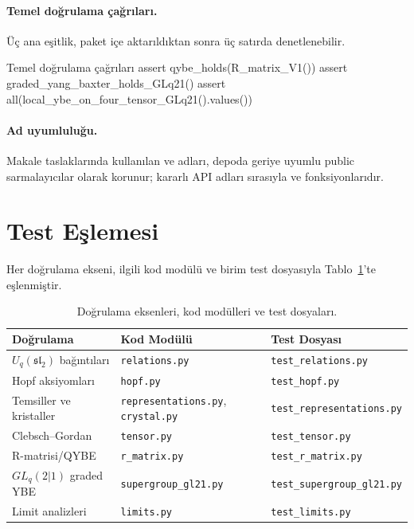 \documentclass[10pt]{math}
\numberwithin{equation}{section}
\theoremstyle{plain}
\theoremstyle{definition}
\renewcommand{\sl}{\mathfrak{sl}}
\begin{document}
\paragraph{Temel doğrulama çağrıları.} Üç ana eşitlik, paket içe aktarıldıktan
sonra üç satırda denetlenebilir.
\begin{pythoncode}{Temel doğrulama çağrıları}
assert qybe_holds(R_matrix_V1())
assert graded_yang_baxter_holds_GLq21()
assert all(local_ybe_on_four_tensor_GLq21().values())
\end{pythoncode}

\paragraph{Ad uyumluluğu.} Makale taslaklarında kullanılan
 ve 
adları, depoda geriye uyumlu public sarmalayıcılar olarak korunur; kararlı API
adları sırasıyla  ve
 fonksiyonlarıdır.

\section{Test Eşlemesi}

Her doğrulama ekseni, ilgili kod modülü ve birim test dosyasıyla
Tablo~\ref{tab:tests}'te eşlenmiştir.

\begin{table}[H]
\centering
\footnotesize
\caption{Doğrulama eksenleri, kod modülleri ve test dosyaları.}
\label{tab:tests}
\begin{tabularx}{\textwidth}{@{}>{\raggedright\arraybackslash}p{}X>{\raggedright\arraybackslash}p{}@{}}
\toprule
Doğrulama & Kod Modülü & Test Dosyası \\
\midrule
$U_q(\sl_2)$ bağıntıları & \texttt{relations.py} & \texttt{test\_relations.py} \\
Hopf aksiyomları & \texttt{hopf.py} & \texttt{test\_hopf.py} \\
Temsiller ve kristaller & \texttt{representations.py}, \texttt{crystal.py} & \texttt{test\_representations.py} \\
Clebsch--Gordan & \texttt{tensor.py} & \texttt{test\_tensor.py} \\
R-matrisi/QYBE & \texttt{r\_matrix.py} & \texttt{test\_r\_matrix.py} \\
$GL_q(2|1)$ graded YBE & \texttt{supergroup\_gl21.py} & \texttt{test\_supergroup\_gl21.py} \\
Limit analizleri & \texttt{limits.py} & \texttt{test\_limits.py} \\
\bottomrule
\end{tabularx}
\end{table}
\end{document}
